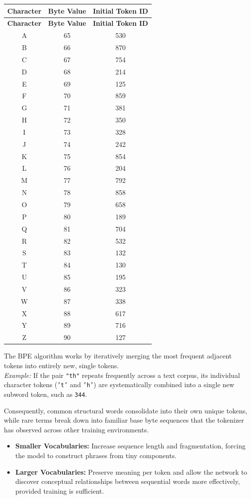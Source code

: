 \documentclass{article}
\begin{document}
\begin{longtable}{ccc}
\toprule
\textbf{Character} & \textbf{Byte Value} & \textbf{Initial Token ID} \\
\midrule
\endfirsthead
\toprule
\textbf{Character} & \textbf{Byte Value} & \textbf{Initial Token ID} \\
\midrule
\endhead
\bottomrule
\endfoot
\bottomrule
\endlastfoot
A & 65 & 530 \\
B & 66 & 870 \\
C & 67 & 754 \\
D & 68 & 214 \\
E & 69 & 125 \\
F & 70 & 859 \\
G & 71 & 381 \\
H & 72 & 350 \\
I & 73 & 328 \\
J & 74 & 242 \\
K & 75 & 854 \\
L & 76 & 204 \\
M & 77 & 792 \\
N & 78 & 858 \\
O & 79 & 658 \\
P & 80 & 189 \\
Q & 81 & 704 \\
R & 82 & 532 \\
S & 83 & 132 \\
T & 84 & 130 \\
U & 85 & 195 \\
V & 86 & 323 \\
W & 87 & 338 \\
X & 88 & 617 \\
Y & 89 & 716 \\
Z & 90 & 127 \\
\end{longtable}

The BPE algorithm works by iteratively merging the most frequent adjacent tokens into entirely new, single tokens.
\\\emph{Example:} If the pair \texttt{"th"} repeats frequently across a text corpus, its individual character tokens (\texttt{'t'} and \texttt{'h'}) are systematically combined into a single new subword token, such as \texttt{344}. 

Consequently, common structural words consolidate into their own unique tokens, while rare terms break down into familiar base byte sequences that the tokenizer has observed across other training environments.
\begin{itemize}
    \item \textbf{Smaller Vocabularies:} Increase sequence length and fragmentation, forcing the model to construct phrases from tiny components.
    \item \textbf{Larger Vocabularies:} Preserve meaning per token and allow the network to discover conceptual relationships between sequential words more effectively, provided training is sufficient.
\end{itemize}
\end{document}
